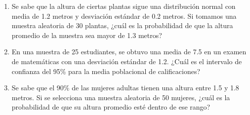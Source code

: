 \begin{Ejer}
\begin{enumerate}
    \item Se sabe que la altura de ciertas plantas sigue una distribución normal con media de 1.2 metros y desviación estándar de 0.2 metros. Si tomamos una muestra aleatoria de 30 plantas, ¿cuál es la probabilidad de que la altura promedio de la muestra sea mayor de 1.3 metros?
    \item En una muestra de 25 estudiantes, se obtuvo una media de 7.5 en un examen de matemáticas con una desviación estándar de 1.2. ¿Cuál es el intervalo de confianza del 95\% para la media poblacional de calificaciones?
    \item Se sabe que el 90\% de las mujeres adultas tienen una altura entre 1.5 y 1.8 metros. Si se selecciona una muestra aleatoria de 50 mujeres, ¿cuál es la probabilidad de que su altura promedio esté dentro de ese rango?

\end{enumerate}
\end{Ejer} 

